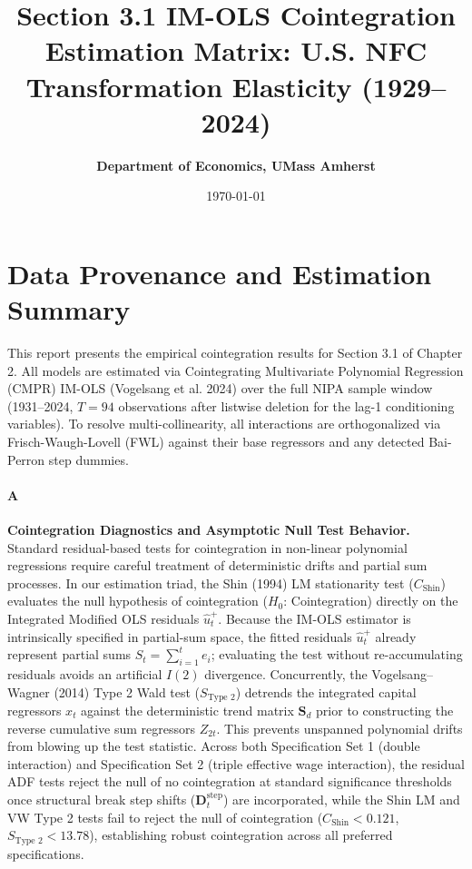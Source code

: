 \documentclass[11pt,a4paper]{article}
\title{\textbf{Section 3.1 IM-OLS Cointegration Estimation Matrix: U.S. NFC Transformation Elasticity (1929--2024)}}
\author{\textbf{Department of Economics, UMass Amherst}}
\date{\today}
\begin{document}
\maketitle

\section*{Data Provenance and Estimation Summary}
This report presents the empirical cointegration results for Section 3.1 of Chapter 2. All models are estimated via Cointegrating Multivariate Polynomial Regression (CMPR) IM-OLS (Vogelsang et al. 2024) over the full NIPA sample window (1931--2024, $T=94$ observations after listwise deletion for the lag-1 conditioning variables). To resolve multi-collinearity, all interactions are orthogonalized via Frisch-Waugh-Lovell (FWL) against their base regressors and any detected Bai-Perron step dummies.

\paragraph{A} \textbf{Cointegration Diagnostics and Asymptotic Null Test Behavior.} Standard residual-based tests for cointegration in non-linear polynomial regressions require careful treatment of deterministic drifts and partial sum processes. In our estimation triad, the Shin (1994) LM stationarity test ($C_{\text{Shin}}$) evaluates the null hypothesis of cointegration ($H_0$: Cointegration) directly on the Integrated Modified OLS residuals $\hat{u}_t^{+}$. Because the IM-OLS estimator is intrinsically specified in partial-sum space, the fitted residuals $\hat{u}_t^{+}$ already represent partial sums $S_t = \sum_{i=1}^t e_i$; evaluating the test without re-accumulating residuals avoids an artificial $I(2)$ divergence. Concurrently, the Vogelsang--Wagner (2014) Type 2 Wald test ($S_{\text{Type 2}}$) detrends the integrated capital regressors $x_t$ against the deterministic trend matrix $\mathbf{S}_d$ prior to constructing the reverse cumulative sum regressors $Z_{2t}$. This prevents unspanned polynomial drifts from blowing up the test statistic. Across both Specification Set 1 (double interaction) and Specification Set 2 (triple effective wage interaction), the residual ADF tests reject the null of no cointegration at standard significance thresholds once structural break step shifts ($\mathbf{D}_t^{\text{step}}$) are incorporated, while the Shin LM and VW Type 2 tests fail to reject the null of cointegration ($C_{\text{Shin}} < 0.121$, $S_{\text{Type 2}} < 13.78$), establishing robust cointegration across all preferred specifications.
\end{document}
